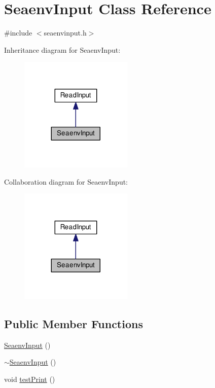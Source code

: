 \hypertarget{class_seaenv_input}{\section{Seaenv\-Input Class Reference}
\label{class_seaenv_input}
}


{\ttfamily \#include $<$seaenvinput.\-h$>$}



Inheritance diagram for Seaenv\-Input\-:\nopagebreak
\begin{figure}[H]
\begin{center}
\leavevmode
\includegraphics[width=152pt]{class_seaenv_input__inherit__graph}
\end{center}
\end{figure}


Collaboration diagram for Seaenv\-Input\-:\nopagebreak
\begin{figure}[H]
\begin{center}
\leavevmode
\includegraphics[width=152pt]{class_seaenv_input__coll__graph}
\end{center}
\end{figure}
\subsection*{Public Member Functions}
\begin{DoxyCompactItemize}
\item 
\hyperlink{class_seaenv_input_a1d4cf4bbf2effd0d558b7b97b02a092a}{Seaenv\-Input} ()
\item 
\hyperlink{class_seaenv_input_a1211270b8f35af72156e623852ce85a7}{$\sim$\-Seaenv\-Input} ()
\item 
void \hyperlink{class_seaenv_input_af215cdefc653fb335dc68de34962201f}{test\-Print} ()
\end{DoxyCompactItemize}
